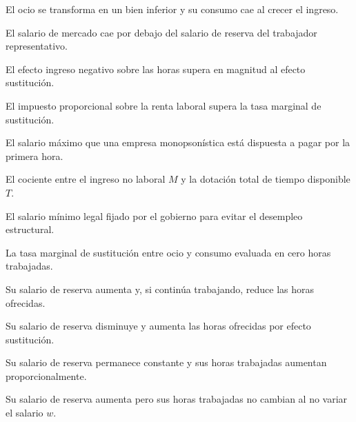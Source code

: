 \begin{opts}
    \item El ocio se transforma en un bien inferior y su consumo cae al crecer el ingreso.
    \item El salario de mercado cae por debajo del salario de reserva del trabajador representativo.
    \item El efecto ingreso negativo sobre las horas supera en magnitud al efecto sustitución.
    \item El impuesto proporcional sobre la renta laboral supera la tasa marginal de sustitución.
\end{opts}

\begin{opts}
    \item El salario máximo que una empresa monopsonística está dispuesta a pagar por la primera hora.
    \item El cociente entre el ingreso no laboral $M$ y la dotación total de tiempo disponible $T$.
    \item El salario mínimo legal fijado por el gobierno para evitar el desempleo estructural.
    \item La tasa marginal de sustitución entre ocio y consumo evaluada en cero horas trabajadas.
\end{opts}

\begin{opts}
    \item Su salario de reserva aumenta y, si continúa trabajando, reduce las horas ofrecidas.
    \item Su salario de reserva disminuye y aumenta las horas ofrecidas por efecto sustitución.
    \item Su salario de reserva permanece constante y sus horas trabajadas aumentan proporcionalmente.
    \item Su salario de reserva aumenta pero sus horas trabajadas no cambian al no variar el salario $w$.
\end{opts}

